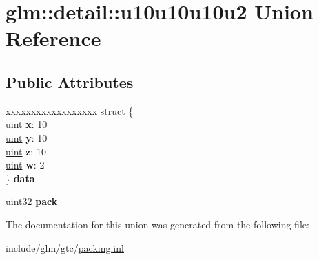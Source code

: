 \hypertarget{unionglm_1_1detail_1_1u10u10u10u2}{}\section{glm\+:\+:detail\+:\+:u10u10u10u2 Union Reference}
\label{unionglm_1_1detail_1_1u10u10u10u2}
\subsection*{Public Attributes}
\begin{DoxyCompactItemize}
\item 
\mbox{\label{unionglm_1_1detail_1_1u10u10u10u2_a45ed3694a048e29cc1f06ea26795c4ef}} 
\begin{tabbing}
xx\=xx\=xx\=xx\=xx\=xx\=xx\=xx\=xx\=\kill
struct \{\\
\>\hyperlink{group__core__precision_ga4fd29415871152bfb5abd588334147c8}{uint} {\bfseries x}: 10\\
\>\hyperlink{group__core__precision_ga4fd29415871152bfb5abd588334147c8}{uint} {\bfseries y}: 10\\
\>\hyperlink{group__core__precision_ga4fd29415871152bfb5abd588334147c8}{uint} {\bfseries z}: 10\\
\>\hyperlink{group__core__precision_ga4fd29415871152bfb5abd588334147c8}{uint} {\bfseries w}: 2\\
\} {\bfseries data}\\

\end{tabbing}\item 
\mbox{\label{unionglm_1_1detail_1_1u10u10u10u2_a8bb9d7804af09ba3790a4b5622321511}} 
uint32 {\bfseries pack}
\end{DoxyCompactItemize}


The documentation for this union was generated from the following file\+:\begin{DoxyCompactItemize}
\item 
include/glm/gtc/\hyperlink{packing_8inl}{packing.\+inl}\end{DoxyCompactItemize}
